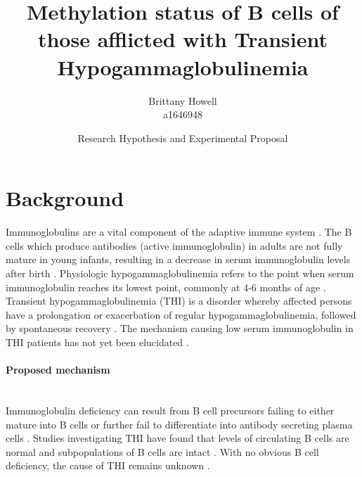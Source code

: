 \documentclass[12pt]{article}
\title{Methylation status of B cells of those afflicted with Transient Hypogammaglobulinemia}
\date{Research Hypothesis and Experimental Proposal}
\author{Brittany Howell \\ a1646948}
\begin{document}
	\maketitle
	
	\section{Background}
	
		Immunoglobulins are a vital component of the adaptive immune system \citep{Simon15}.  
		The B cells which produce antibodies (active immunoglobulin) in adults are not fully mature in young infants, resulting in a decrease in serum immunoglobulin levels after birth \citep{Martin10,Rechavi15,Stiemh80}. 
		Physiologic hypogammaglobulinemia refers to the point when serum immunoglobulin reaches its lowest point, commonly at 4-6 months of age \citep{Dressler89}. 
		Transient hypogammaglobulinemia (THI) is a disorder whereby affected persons have a prolongation or exacerbation of regular hypogammaglobulinemia, followed by spontaneous recovery \citep{Stiemh80,Dressler89,AlHerz14,Gitlin56,AlHerz11,Rosen66,McGeady87, Dalal98,Tiller78,Buckley83}.
		The mechanism causing low serum immunoglobulin in THI patients has not yet been elucidated \citep{AlHerz14}. 

	
		\paragraph{Proposed mechanism} 
			~\\
			Immunoglobulin deficiency can result from B cell precursors failing to either mature into B cells or further fail to differentiate into antibody secreting plasma cells \citep{Fiorilli86}. 
			Studies investigating THI have found that levels of circulating B cells are normal and subpopulations of B cells are intact \citep{Tiller78,Stiemh80,Siegel81,Buckley83,Fiorilli86,Dressler89}.
			With no obvious B cell deficiency, the cause of THI remains unknown \citep{AlHerz14}. 
			
\end{document}
